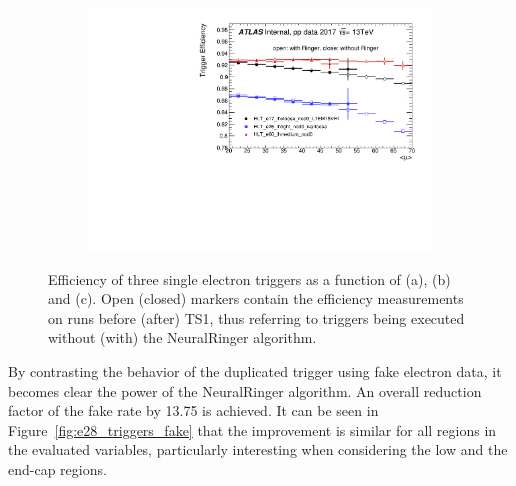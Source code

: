 \begin{figure}[h!tb]
\begin{center}
\begin{subfigure}[c]{.48\textwidth}
  \centering
  \includegraphics[width=\textwidth]{sections/operation/figures/efficiencies/eff_EGAM1_e17_e26_e60_2017_before_and_after_ts1_mu.pdf}
  \caption{}%
  \end{subfigure}
  \caption{Efficiency of three single electron triggers as a function of
  \et (a), \eta (b) and \avgmu (c). Open (closed) markers contain
  the efficiency measurements on runs before (after) TS1, thus referring to
  triggers being executed without (with) the NeuralRinger algorithm.
  }%
  \label{fig:2017_ts1}
  \end{center}
\end{figure}


By contrasting the behavior of the duplicated trigger using fake electron data,
it becomes clear the power of the NeuralRinger algorithm. An overall reduction factor of
the fake rate by 13.75 is achieved. It can be seen in
Figure~\ref{fig:e28_triggers_fake} that the improvement is similar for all
regions in the evaluated variables, particularly interesting when
considering the low \et{} and the end-cap regions.




